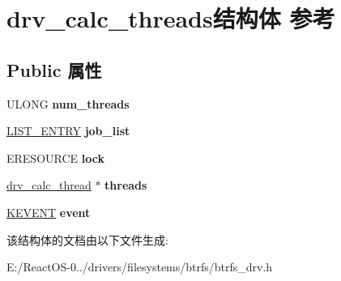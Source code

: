 \hypertarget{structdrv__calc__threads}{}\section{drv\+\_\+calc\+\_\+threads结构体 参考}
\label{structdrv__calc__threads}
\subsection*{Public 属性}
\begin{DoxyCompactItemize}
\item 
\mbox{\label{structdrv__calc__threads_a400e5fcc1522e23d6785ffb06b4e6561}} 
U\+L\+O\+NG {\bfseries num\+\_\+threads}
\item 
\mbox{\label{structdrv__calc__threads_a41800d8ab8e7f4b9a90eb7f89a9b61ba}} 
\hyperlink{struct___l_i_s_t___e_n_t_r_y}{L\+I\+S\+T\+\_\+\+E\+N\+T\+RY} {\bfseries job\+\_\+list}
\item 
\mbox{\label{structdrv__calc__threads_a39b019ef8fa7b9fea32555cbf6eafa6d}} 
E\+R\+E\+S\+O\+U\+R\+CE {\bfseries lock}
\item 
\mbox{\label{structdrv__calc__threads_ac721d9b1c792377017abd7d860db538b}} 
\hyperlink{structdrv__calc__thread}{drv\+\_\+calc\+\_\+thread} $\ast$ {\bfseries threads}
\item 
\mbox{\label{structdrv__calc__threads_a6db047cb5af86e1beea259f24f16e2f6}} 
\hyperlink{struct___k_e_v_e_n_t}{K\+E\+V\+E\+NT} {\bfseries event}
\end{DoxyCompactItemize}


该结构体的文档由以下文件生成\+:\begin{DoxyCompactItemize}
\item 
E\+:/\+React\+O\+S-\/0../drivers/filesystems/btrfs/btrfs\+\_\+drv.\+h\end{DoxyCompactItemize}
